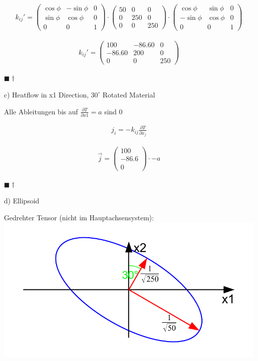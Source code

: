 \documentclass[a4paper]{scrartcl}
\newcommand{\qed}{\begin{flushright}
$\blacksquare \dagger$ \end{flushright}}
\begin{document}
\begin{align}
k_{ij}'=\begin{pmatrix}
\cos{\phi} & -\sin{\phi} & 0 \\
\sin{\phi} & \cos{\phi} & 0 \\
0 & 0 & 1
\end{pmatrix}
\cdot
\begin{pmatrix}
50 & 0 & 0 \\
0 & 250 & 0 \\
0 & 0 & 250 
\end{pmatrix}
\cdot
\begin{pmatrix}
\cos{\phi} & \sin{\phi} & 0 \\
-\sin{\phi} & \cos{\phi} & 0 \\
0 & 0 & 1
\end{pmatrix}
\end{align}

\begin{align}
k_{ij}'=\begin{pmatrix}
100 & -86.60 & 0 \\
-86.60 & 200 & 0 \\
0 & 0 & 250
\end{pmatrix}
\end{align}
\qed

c) Heatflow in x1 Direction, $30^\circ$ Rotated Material

Alle Ableitungen bis auf $\frac{\partial T}{\partial x1}=a$ sind 0


\begin{align}
j_i=-k_{ij} \frac{\partial T}{\partial x_j}
\end{align}

\begin{align}
\vec{j}=\begin{pmatrix}
100 \\
-86.6 \\
0
\end{pmatrix}
\cdot -a
\end{align}

\qed
d) Ellipsoid

\begin{center}
Gedrehter Tensor (nicht im Hauptachsensystem):\\
\includegraphics[scale=0.8]{images/quadrik_2d_ellipse_uebung_rotation.pdf}
\end{center}
\end{document}
